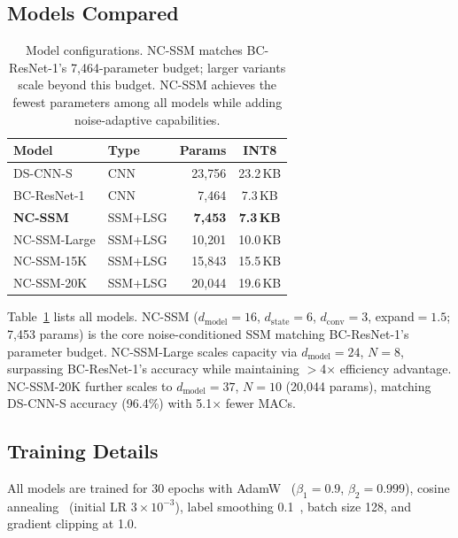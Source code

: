 \documentclass[journal]{IEEEtran}
\begin{document}
\subsection{Models Compared}

\begin{table}[t]
\centering
\caption{Model configurations. NC-SSM matches BC-ResNet-1's 7{,}464-parameter budget; larger variants scale beyond this budget. NC-SSM achieves the fewest parameters among all models while adding noise-adaptive capabilities.}
\label{tab:configs}
\small
\setlength{\tabcolsep}{3pt}
\begin{tabular}{llrc}
\toprule
\textbf{Model} & \textbf{Type} & \textbf{Params} & \textbf{INT8} \\
\midrule
DS-CNN-S~\cite{zhang2017hello} & CNN & 23{,}756 & 23.2\,KB \\
BC-ResNet-1~\cite{kim2021bcresnet} & CNN & 7{,}464 & 7.3\,KB \\
\midrule
\textbf{NC-SSM} & SSM+LSG & \textbf{7{,}453} & \textbf{7.3\,KB} \\
NC-SSM-Large & SSM+LSG & 10{,}201 & 10.0\,KB \\
NC-SSM-15K & SSM+LSG & 15{,}843 & 15.5\,KB \\
NC-SSM-20K & SSM+LSG & 20{,}044 & 19.6\,KB \\
\bottomrule
\end{tabular}
\end{table}

Table~\ref{tab:configs} lists all models.
NC-SSM ($d_{\text{model}}{=}16$, $d_{\text{state}}{=}6$, $d_{\text{conv}}{=}3$, expand${=}1.5$; 7{,}453 params) is the core noise-conditioned SSM matching BC-ResNet-1's parameter budget.
NC-SSM-Large scales capacity via $d_{\text{model}}{=}24$, $N{=}8$, surpassing BC-ResNet-1's accuracy while maintaining $>$4$\times$ efficiency advantage.
NC-SSM-20K further scales to $d_{\text{model}}{=}37$, $N{=}10$ (20{,}044 params), matching DS-CNN-S accuracy (96.4\%) with 5.1$\times$ fewer MACs.

\subsection{Training Details}

All models are trained for 30 epochs with AdamW~\cite{loshchilov2019adamw} ($\beta_1{=}0.9$, $\beta_2{=}0.999$), cosine annealing~\cite{loshchilov2017sgdr} (initial LR $3{\times}10^{-3}$), label smoothing 0.1~\cite{szegedy2016rethinking}, batch size 128, and gradient clipping at 1.0.
\end{document}
